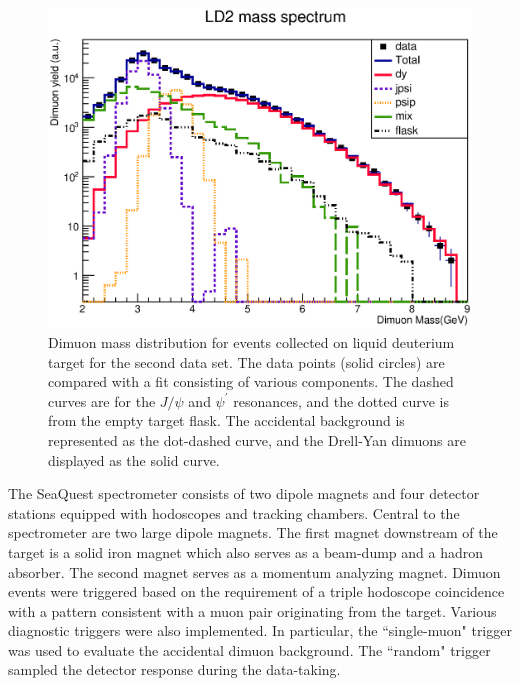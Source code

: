 \documentclass[reprint,aps,unsortedaddress,superscriptaddress,prl,floatfix,showpacs,linenumbers]{revtex4-2}
\begin{document}
\begin{figure}[tb]
	\includegraphics*[width=\linewidth]{massFit/LD2_massfit}
	\caption{Dimuon mass distribution for events collected
		on liquid deuterium target for the second data set.
		The data points (solid circles) are
		compared with a fit consisting of various components. The dashed curves are
		for the $J/\psi$ and $\psi^\prime$ resonances, and the dotted curve is from the
		empty target flask. The accidental background is represented as the
		dot-dashed curve, and the Drell-Yan dimuons are displayed as the solid curve.}
	\label{Fig:LD2_Mass}
\end{figure}


The SeaQuest spectrometer consists of two dipole magnets and
four detector stations equipped with hodoscopes and tracking chambers.
Central to the spectrometer are two large dipole magnets.
The first magnet downstream of the target is a solid iron magnet which
also serves as a beam-dump and a hadron absorber. The second
magnet serves as a momentum analyzing magnet. Dimuon events
were triggered based on the requirement of a triple hodoscope
coincidence with a pattern consistent with a muon pair originating
from the target. Various diagnostic triggers were also implemented.
In particular, the ``single-muon" trigger was used to evaluate the
accidental dimuon
background. The ``random" trigger sampled the
detector response during the data-taking.
\end{document}
